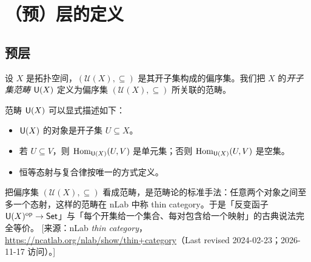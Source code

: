 
\section{（预）层的定义}\label{sec:1}

\subsection{预层}\label{sec:1.1}

\begin{definition}\label{def:1.1.1}
设 $X$ 是拓扑空间，$(\mathcal U(X),\subseteq)$ 是其开子集构成的偏序集。我们把 $X$ 的\emph{开子集范畴} $\mathsf{U}(X)$ 定义为偏序集 $(\mathcal U(X),\subseteq)$ 所关联的范畴。
\end{definition}

范畴 $\mathsf{U}(X)$ 可以显式描述如下：
\begin{itemize}
  \item $\mathsf{U}(X)$ 的对象是开子集 $U\subseteq X$。
  \item 若 $U\subseteq V$，则 $\operatorname{Hom}_{\mathsf{U}(X)}(U,V)$ 是单元集；否则 $\operatorname{Hom}_{\mathsf{U}(X)}(U,V)$ 是空集。
  \item 恒等态射与复合律按唯一的方式定义。
\end{itemize}

\begin{yizhu}
把偏序集 $(\mathcal U(X),\subseteq)$ 看成范畴，是范畴论的标准手法：任意两个对象之间至多一个态射，这样的范畴在 nLab 中称 thin category。于是「反变函子 $\mathsf{U}(X)^{\mathrm{op}}\to\mathsf{Set}$」与「每个开集给一个集合、每对包含给一个映射」的古典说法完全等价。
[来源：nLab \emph{thin category}，\url{https://ncatlab.org/nlab/show/thin+category}（Last revised 2024-02-23；2026-11-17 访问）。]
\end{yizhu}

